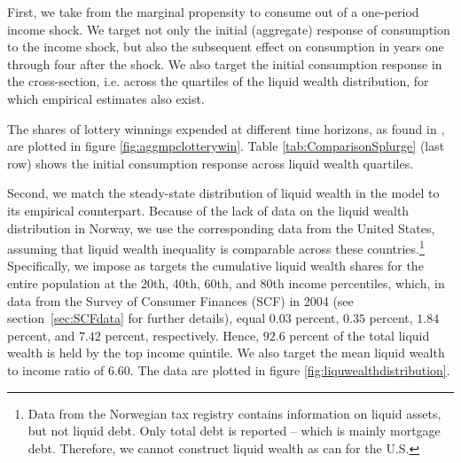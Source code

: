 \documentclass[\econtexRoot/HAFiscal]{subfiles}
\begin{document}
First, we take from \citet{fagereng_mpc_2021} the marginal propensity to consume out of a one-period income shock. We target not only the initial (aggregate) response of consumption to the income shock, but also the subsequent effect on consumption in years one through four after the shock. We also target the initial consumption response in the cross-section, i.e. across the quartiles of the liquid wealth distribution, for which empirical estimates also exist. 

The shares of lottery winnings expended at different time horizons, as found in \citet{fagereng_mpc_2021}, are plotted in figure \ref{fig:aggmpclotterywin}. Table \ref{tab:ComparisonSplurge} (last row) shows the initial consumption response across liquid wealth quartiles. 

Second, we match the steady-state distribution of liquid wealth in the model to its empirical counterpart. Because of the lack of data on the liquid wealth distribution in Norway, we use the corresponding data from the United States, assuming that liquid wealth inequality is comparable across these countries.\footnote{Data from the Norwegian tax registry contains information on liquid assets, but not liquid debt. Only total debt is reported -- which is mainly mortgage debt. Therefore, we cannot construct liquid wealth as \citet{kaplan2014model} can for the U.S. \notinsubfile{\label{foot:liqwealth}}} 
Specifically, we impose as targets the cumulative liquid wealth shares for the entire population at the 20th, 40th, 60th, and 80th income percentiles, which, in data from the Survey of Consumer Finances (SCF) in 2004 (see section~\ref{sec:SCFdata} for further details), equal $0.03$ percent, $0.35$ percent, $1.84$ percent, and $7.42$ percent, respectively. Hence, $92.6$ percent of the total liquid wealth is held by the top income quintile. We also target the mean liquid wealth to income ratio of 6.60. The data are plotted in figure \ref{fig:liquwealthdistribution}.
\end{document}

